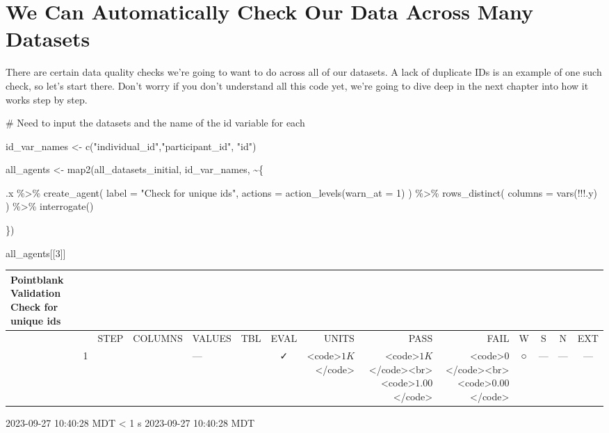 \documentclass[
  letterpaper,
  DIV=11,
  numbers=noendperiod]{scrreprt}
\newenvironment{Shaded}{\begin{snugshade}}{\end{snugshade}}
\newcommand{\AttributeTok}[1]{\textcolor[rgb]{0.40,0.45,0.13}{#1}}
\newcommand{\CommentTok}[1]{\textcolor[rgb]{0.37,0.37,0.37}{#1}}
\newcommand{\DecValTok}[1]{\textcolor[rgb]{0.68,0.00,0.00}{#1}}
\newcommand{\FunctionTok}[1]{\textcolor[rgb]{0.28,0.35,0.67}{#1}}
\newcommand{\NormalTok}[1]{\textcolor[rgb]{0.00,0.23,0.31}{#1}}
\newcommand{\OtherTok}[1]{\textcolor[rgb]{0.00,0.23,0.31}{#1}}
\newcommand{\SpecialCharTok}[1]{\textcolor[rgb]{0.37,0.37,0.37}{#1}}
\newcommand{\StringTok}[1]{\textcolor[rgb]{0.13,0.47,0.30}{#1}}
\begin{document}
\hypertarget{we-can-automatically-check-our-data-across-many-datasets}{%
\section{We Can Automatically Check Our Data Across Many
Datasets}\label{we-can-automatically-check-our-data-across-many-datasets}}

There are certain data quality checks we're going to want to do across
all of our datasets. A lack of duplicate IDs is an example of one such
check, so let's start there. Don't worry if you don't understand all
this code yet, we're going to dive deep in the next chapter into how it
works step by step.

\begin{Shaded}
\begin{Highlighting}[]
\CommentTok{\# Need to input the datasets and the name of the id variable for each}

\NormalTok{id\_var\_names }\OtherTok{\textless{}{-}} \FunctionTok{c}\NormalTok{(}\StringTok{"individual\_id"}\NormalTok{,}\StringTok{"participant\_id"}\NormalTok{, }\StringTok{"id"}\NormalTok{)}

\NormalTok{all\_agents }\OtherTok{\textless{}{-}} \FunctionTok{map2}\NormalTok{(all\_datasets\_initial, id\_var\_names, }\SpecialCharTok{\textasciitilde{}}\NormalTok{\{}
  
\NormalTok{  .x }\SpecialCharTok{\%\textgreater{}\%}
    \FunctionTok{create\_agent}\NormalTok{(}
      \AttributeTok{label =} \StringTok{"Check for unique ids"}\NormalTok{,}
      \AttributeTok{actions =} \FunctionTok{action\_levels}\NormalTok{(}\AttributeTok{warn\_at =} \DecValTok{1}\NormalTok{)}
\NormalTok{    ) }\SpecialCharTok{\%\textgreater{}\%}
    \FunctionTok{rows\_distinct}\NormalTok{(}
      \AttributeTok{columns =} \FunctionTok{vars}\NormalTok{(}\SpecialCharTok{!!!}\NormalTok{.y)}
\NormalTok{    ) }\SpecialCharTok{\%\textgreater{}\%}
    \FunctionTok{interrogate}\NormalTok{()}
  
\NormalTok{\})}

\NormalTok{all\_agents[[}\DecValTok{3}\NormalTok{]]}
\end{Highlighting}
\end{Shaded}

\setlength{\LTpost}{0mm}
\begin{longtable}{lrlllccrrrcccc}
\caption*{
{\large Pointblank Validation} \\ 
{\small Check for unique ids}
} \\ 
\toprule
 &  & STEP & COLUMNS & VALUES & TBL & EVAL & UNITS & PASS & FAIL & W & S & N & EXT \\ 
\midrule
 & 1 &  &  & — &                                                              & ✓ & <code>$1K$</code> & <code>$1K$</code><br><code>$1.00$</code> & <code>$0$</code><br><code>$0.00$</code> & ○ & --- & --- & --- \\ 
\bottomrule
\end{longtable}
\begin{minipage}{\linewidth}
2023-09-27 10:40:28 MDT
\textless{} 1 s
2023-09-27 10:40:28 MDT\\
\end{minipage}
\end{document}
